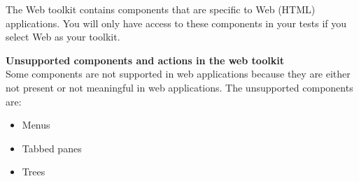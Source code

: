 
The Web toolkit contains components that are specific to Web (HTML) applications. You will only have access to these components in your tests if you select Web as your \gdaut{} toolkit. 

\textbf{Unsupported components and actions in the web toolkit}\\
Some components are not supported in web applications because they are either not present or not meaningful in web applications. The unsupported components are:
\begin{itemize}
\item Menus
\item Tabbed panes
\item Trees
\end{itemize}
